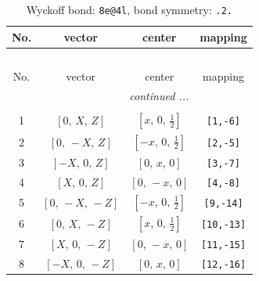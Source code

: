 \documentclass[fleqn,8pt]{jsarticle}
\begin{document}
\begin{longtable}{cccc}
\caption{Wyckoff bond: {\tt 8e@4l}, bond symmetry: {\tt .2.}}
 \\
 \hline \hline
No. & vector & center & mapping \\ \hline \endfirsthead

\multicolumn{3}{l}{\tablename\ \thetable{}} \\
 \hline \hline
No. & vector & center & mapping \\ \hline \endhead

 \hline \hline
\multicolumn{3}{r}{\footnotesize\it continued ...} \\ \endfoot

 \hline \hline
\multicolumn{3}{r}{} \\ \endlastfoot

1 & $\left[ 0,\, X,\, Z \right]$ & $\left[ x,\, 0,\, \frac{1}{2} \right]$ & {\tt [1,-6]} \\ \hline
2 & $\left[ 0,\, - X,\, Z \right]$ & $\left[ - x,\, 0,\, \frac{1}{2} \right]$ & {\tt [2,-5]} \\ \hline
3 & $\left[ - X,\, 0,\, Z \right]$ & $\left[ 0,\, x,\, 0 \right]$ & {\tt [3,-7]} \\ \hline
4 & $\left[ X,\, 0,\, Z \right]$ & $\left[ 0,\, - x,\, 0 \right]$ & {\tt [4,-8]} \\ \hline
5 & $\left[ 0,\, - X,\, - Z \right]$ & $\left[ - x,\, 0,\, \frac{1}{2} \right]$ & {\tt [9,-14]} \\ \hline
6 & $\left[ 0,\, X,\, - Z \right]$ & $\left[ x,\, 0,\, \frac{1}{2} \right]$ & {\tt [10,-13]} \\ \hline
7 & $\left[ X,\, 0,\, - Z \right]$ & $\left[ 0,\, - x,\, 0 \right]$ & {\tt [11,-15]} \\ \hline
8 & $\left[ - X,\, 0,\, - Z \right]$ & $\left[ 0,\, x,\, 0 \right]$ & {\tt [12,-16]} \\
\end{longtable}
\renewcommand{\arraystretch}{1.2}
\end{document}
